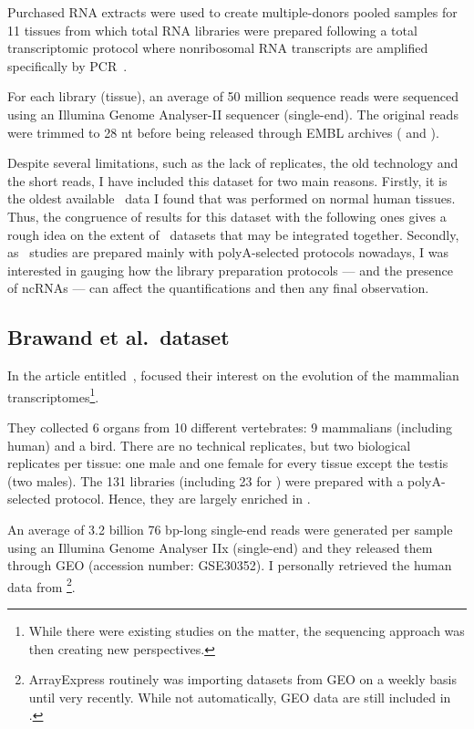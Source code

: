 Purchased \gls{RNA} extracts were used to create multiple-donors pooled
samples for 11 tissues from which total \gls{RNA} libraries were prepared
following a total transcriptomic protocol
where nonribosomal \gls{RNA} transcripts are
amplified specifically by \gls{PCR}~.

For each library (tissue), an average of 50 million sequence reads were sequenced
using an Illumina Genome Analyser-II sequencer (single-end).
The original reads were trimmed to 28 \gls{nt}
before being released through EMBL archives (
and ).

Despite several limitations, such as the lack of replicates, the old technology and
the short reads,
I have included this dataset for two main reasons.
Firstly, it is the oldest available
\Rnaseq\ data I found that was performed on normal human tissues.
Thus, the congruence of results for this dataset with the following ones
gives a rough idea on the extent of \Rnaseq\ datasets
that may be integrated together.
Secondly, as \Rnaseq\ studies are prepared mainly with polyA-selected protocols
nowadays, I was interested in gauging how the library preparation
protocols --- and the presence of \glspl{ncRNA} --- can affect the
quantifications and then any final observation.


\subsection{Brawand et al.\ dataset}\label{subsec:brawandpresentation}
\vspace*{-0.2in}
In the article entitled~,
\citet{VTpaper} focused their interest on the
evolution of the mammalian transcriptomes\footnote{While there were existing
studies on the matter, the sequencing approach was then creating new perspectives.}.

They collected 6 organs from 10 different vertebrates:
9 mammalians (including human) and a bird. There are no technical replicates,
but  two biological replicates per tissue:
one male and one female for every tissue except the testis (two males).
The 131 libraries (including 23 for ) were prepared with
a polyA-selected protocol.
Hence, they are largely enriched in \pcgs.

An average of 3.2 billion 76 \gls{bp}-long single-end reads were generated per sample
using an Illumina Genome Analyser IIx (single-end) and they released them
through \gls{GEO} (accession number: GSE30352).
I personally retrieved the human data from
\footnote{ArrayExpress routinely was importing
datasets from \gls{GEO} on a weekly basis until very recently.
While not automatically, \gls{GEO} data are still included in \egxa.}.


